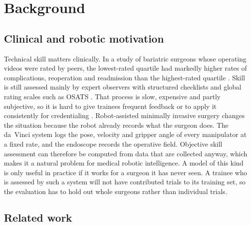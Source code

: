 \section{Background}

\subsection{Clinical and robotic motivation}

Technical skill matters clinically. In a study of bariatric surgeons whose operating videos were rated by peers, the lowest-rated quartile had markedly higher rates of complications, reoperation and readmission than the highest-rated quartile \citep{birkmeyer2013skill}. Skill is still assessed mainly by expert observers with structured checklists and global rating scales such as OSATS \citep{martin1997osats}. That process is slow, expensive and partly subjective, so it is hard to give trainees frequent feedback or to apply it consistently for credentialing \citep{reiley2011review}. Robot-assisted minimally invasive surgery changes the situation because the robot already records what the surgeon does. The da~Vinci system logs the pose, velocity and gripper angle of every manipulator at a fixed rate, and the endoscope records the operative field. Objective skill assessment can therefore be computed from data that are collected anyway, which makes it a natural problem for medical robotic intelligence. A model of this kind is only useful in practice if it works for a surgeon it has never seen. A trainee who is assessed by such a system will not have contributed trials to its training set, so the evaluation has to hold out whole surgeons rather than individual trials.

\subsection{Related work}

